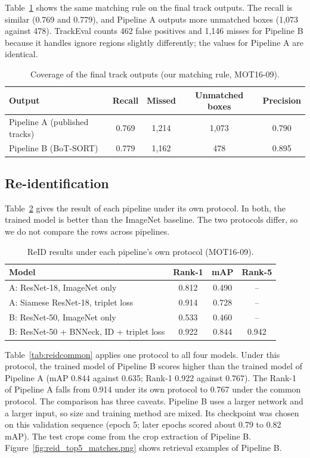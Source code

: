 \documentclass[11pt,letterpaper]{article}
\begin{document}
Table~\ref{tab:cover} shows the same matching rule on the final track outputs.
The recall is similar (0.769 and 0.779), and Pipeline A outputs more unmatched boxes (1,073 against 478).
TrackEval counts 462 false positives and 1,146 misses for Pipeline B because it handles ignore regions slightly differently; the values for Pipeline A are identical.

\begin{table}[ht]
\centering\small
\caption{Coverage of the final track outputs (our matching rule, MOT16-09).}\label{tab:cover}
\begin{tabular}{lcccc}
\toprule
Output & Recall & Missed & Unmatched boxes & Precision \\
\midrule
Pipeline A (published tracks) & 0.769 & 1,214 & 1,073 & 0.790 \\
Pipeline B (BoT-SORT) & 0.779 & 1,162 & 478 & 0.895 \\
\bottomrule
\end{tabular}
\end{table}

\subsection{Re-identification}\label{sec:reid}
Table~\ref{tab:reidown} gives the result of each pipeline under its own protocol.
In both, the trained model is better than the ImageNet baseline.
The two protocols differ, so we do not compare the rows across pipelines.

\begin{table}[ht]
\centering\small
\caption{ReID results under each pipeline's own protocol (MOT16-09).}\label{tab:reidown}
\begin{tabular}{lccc}
\toprule
Model & Rank-1 & mAP & Rank-5 \\
\midrule
A: ResNet-18, ImageNet only & 0.812 & 0.490 & -- \\
A: Siamese ResNet-18, triplet loss & 0.914 & 0.728 & -- \\
B: ResNet-50, ImageNet only & 0.533 & 0.460 & -- \\
B: ResNet-50 + BNNeck, ID + triplet loss & 0.922 & 0.844 & 0.942 \\
\bottomrule
\end{tabular}
\end{table}

Table~\ref{tab:reidcommon} applies one protocol to all four models.
Under this protocol, the trained model of Pipeline B scores higher than the trained model of Pipeline A (mAP 0.844 against 0.635; Rank-1 0.922 against 0.767).
The Rank-1 of Pipeline A falls from 0.914 under its own protocol to 0.767 under the common protocol.
The comparison has three caveats.
Pipeline B uses a larger network and a larger input, so size and training method are mixed.
Its checkpoint was chosen on this validation sequence (epoch 5; later epochs scored about 0.79 to 0.82 mAP).
The test crops come from the crop extraction of Pipeline B.
Figure~\ref{fig:reid_top5_matches.png} shows retrieval examples of Pipeline B.
\end{document}

